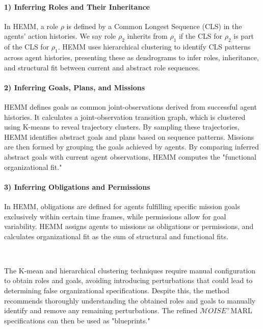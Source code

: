 \documentclass[sigconf,anonymous]{aamas}
\begin{document}
\paragraph{\textbf{1) Inferring Roles and Their Inheritance}}

In HEMM, a role $\rho$ is defined by a Common Longest Sequence (CLS) in the agents' action histories. We say role $\rho_2$ inherits from $\rho_1$ if the CLS for $\rho_2$ is part of the CLS for $\rho_1$. HEMM uses hierarchical clustering to identify CLS patterns across agent histories, presenting these as dendrograms to infer roles, inheritance, and structural fit between current and abstract role sequences.

\paragraph{\textbf{2) Inferring Goals, Plans, and Missions}}

HEMM defines goals as common joint-observations derived from successful agent histories. It calculates a joint-observation transition graph, which is clustered using K-means to reveal trajectory clusters. By sampling these trajectories, HEMM identifies abstract goals and plans based on sequence patterns. Missions are then formed by grouping the goals achieved by agents. By comparing inferred abstract goals with current agent observations, HEMM computes the "functional organizational fit."

\paragraph{\textbf{3) Inferring Obligations and Permissions}}

In HEMM, obligations are defined for agents fulfilling specific mission goals exclusively within certain time frames, while permissions allow for goal variability. HEMM assigns agents to missions as obligations or permissions, and calculates organizational fit as the sum of structural and functional fits.


\

The K-mean and hierarchical clustering techniques require manual configuration to obtain roles and goals, avoiding introducing perturbations that could lead to determining false organizational specifications. Despite this, the method recommends thoroughly understanding the obtained roles and goals to manually identify and remove any remaining perturbations. The refined $\mathcal{M}OISE^+$MARL specifications can then be used as "blueprints."
\end{document}
